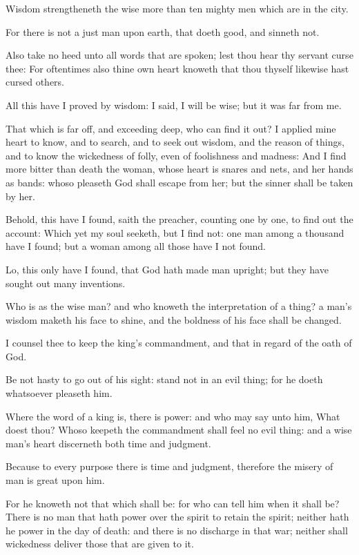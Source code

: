 \Verse Wisdom strengtheneth the wise more than ten mighty men which are in the city.

\Verse For there is not a just man upon earth, that doeth good, and sinneth not.

\Verse Also take no heed unto all words that are spoken; lest thou hear thy servant curse thee: \Verse For oftentimes also thine own heart knoweth that thou thyself likewise hast cursed others.

\Verse All this have I proved by wisdom: I said, I will be wise; but it was far from me.

\Verse That which is far off, and exceeding deep, who can find it out?  \Verse I applied mine heart to know, and to search, and to seek out wisdom, and the reason of things, and to know the wickedness of folly, even of foolishness and madness: \Verse And I find more bitter than death the woman, whose heart is snares and nets, and her hands as bands: whoso pleaseth God shall escape from her; but the sinner shall be taken by her.

\Verse Behold, this have I found, saith the preacher, counting one by one, to find out the account: \Verse Which yet my soul seeketh, but I find not: one man among a thousand have I found; but a woman among all those have I not found.

\Verse Lo, this only have I found, that God hath made man upright; but they have sought out many inventions.


\Chapter
\Verse Who is as the wise man? and who knoweth the interpretation of a thing?  a man's wisdom maketh his face to shine, and the boldness of his face shall be changed.

\Verse I counsel thee to keep the king's commandment, and that in regard of the oath of God.

\Verse Be not hasty to go out of his sight: stand not in an evil thing; for he doeth whatsoever pleaseth him.

\Verse Where the word of a king is, there is power: and who may say unto him, What doest thou?  \Verse Whoso keepeth the commandment shall feel no evil thing: and a wise man's heart discerneth both time and judgment.

\Verse Because to every purpose there is time and judgment, therefore the misery of man is great upon him.

\Verse For he knoweth not that which shall be: for who can tell him when it shall be?  \Verse There is no man that hath power over the spirit to retain the spirit; neither hath he power in the day of death: and there is no discharge in that war; neither shall wickedness deliver those that are given to it.

